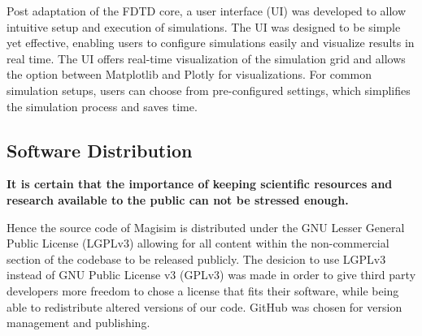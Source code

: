 \documentclass[11pt, a4paper, titlepage]{article}
\begin{document}
Post adaptation of the FDTD core, a user interface (UI) was developed to allow intuitive setup and execution of simulations. The UI was designed to be simple yet effective, enabling users to configure simulations easily and visualize results in real time. The UI offers real-time visualization of the simulation grid and allows the option between Matplotlib and Plotly for visualizations.
For common simulation setups, users can choose from pre-configured settings, which simplifies the simulation process and saves time.






\subsection{Software Distribution}
\textbf{It is certain that the importance of keeping scientific resources and research available to the public can not be stressed enough.}

Hence the source code of Magisim is distributed under the GNU Lesser General Public License (LGPLv3) allowing for all content within the non-commercial section of the codebase to be released publicly. The desicion to use LGPLv3 instead of GNU Public License v3 (GPLv3) was made in order to give third party developers more freedom to chose a license that fits their software, while being able to redistribute altered versions of our code.
GitHub was chosen for version management and publishing.
\end{document}
